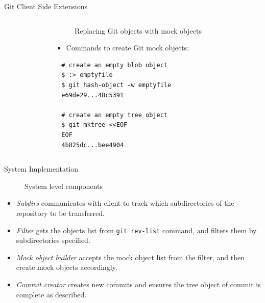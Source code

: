 \documentclass[final]{beamer}
\begin{document}
\begin{frame}[t, fragile]
\begin{columns}[t]
\begin{column}{.49\linewidth}
\begin{block}{Git Client Side Extensions}
\begin{columns}[T]
\begin{column}{.5\textwidth}
\end{column}
          \begin{column}{.5\textwidth}
              \begin{figure} \centering
                \caption{Replacing Git objects with mock objects}
              \end{figure}
              \begin{itemize}
                \item Commands to create Git mock objects:
              \end{itemize}
\begin{verbatim}
  # create an empty blob object
  $ :> emptyfile
  $ git hash-object -w emptyfile
  e69de29...48c5391

  # create an empty tree object
  $ git mktree <<EOF
  EOF
  4b825dc...bee4904
\end{verbatim}
            \end{column}
\end{columns}
      \end{block}
      \begin{block}{System Implementation}
              \begin{figure} \centering
                \caption{System level components}
              \end{figure}
\begin{itemize}
    \justifying
  \item \emph{Subdirs} communicates with client to track which subdirectories
    of the repository to be transferred.

  \item \emph{Filter} gets the objects list from
    \verb|git rev-list| command, and filters them by subdirectories specified.

  \item \emph{Mock object builder} accepts the mock object list
    from the filter, and then create mock objects accordingly.

  \item \emph{Commit creator} creates new commits and ensures
    the tree object of commit is complete as described.
\end{itemize}
      \end{block}
    \end{column}
  \end{columns}
\end{frame}
\end{document}

